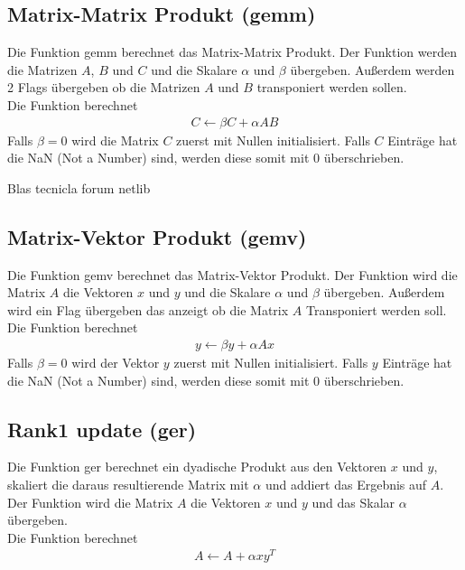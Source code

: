 \subsection{Matrix-Matrix Produkt (gemm)}
Die Funktion \glqq gemm\grqq{} berechnet das Matrix-Matrix Produkt.
Der Funktion werden die Matrizen $A$, $B$ und $C$ und die Skalare $\alpha$ und $\beta$ übergeben. Außerdem werden 2 Flags übergeben ob die Matrizen $A$ und $B$ transponiert werden sollen.\\
Die Funktion berechnet
\begin{align}
	C \leftarrow \beta  C + \alpha  A  B
\end{align}
Falls $\beta = 0$ wird die Matrix $C$ zuerst mit Nullen initialisiert. Falls $C$ Einträge hat die NaN (Not a Number) sind, werden diese somit mit 0 überschrieben.

\cite{blast}
Blas tecnicla forum netlib

\subsection{Matrix-Vektor Produkt (gemv)}
Die Funktion \glqq gemv\grqq{} berechnet das Matrix-Vektor Produkt.
Der Funktion wird die Matrix $A$ die Vektoren $x$ und $y$ und die Skalare $\alpha$ und $\beta$ übergeben. Außerdem wird ein Flag übergeben das anzeigt ob die Matrix $A$ Transponiert werden soll.\\
Die Funktion berechnet
\begin{align}
	y \leftarrow \beta  y + \alpha A x 
\end{align}
Falls $\beta = 0$ wird der Vektor $y$ zuerst mit Nullen initialisiert. Falls $y$ Einträge hat die NaN (Not a Number) sind, werden diese somit mit 0 überschrieben.

\subsection{Rank1 update (ger)}
Die Funktion \glqq ger\grqq{}  berechnet ein dyadische Produkt aus den Vektoren $x$ und $y$, skaliert die daraus resultierende Matrix mit $\alpha$ und addiert das Ergebnis auf $A$.\\
Der Funktion wird die Matrix $A$ die Vektoren $x$ und $y$ und das Skalar $\alpha$ übergeben.\\
Die Funktion berechnet
\begin{align}
	A \leftarrow A + \alpha  x y^T
\end{align}

